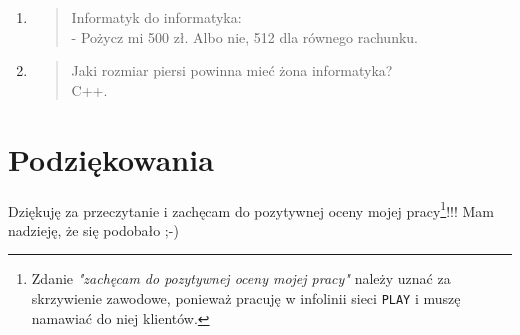 \documentclass[a4paper,12pt]{article}
\begin{document}
\begin{enumerate}
\item \begin{flushleft}
\begin{verse}
Informatyk do informatyka: \\
- Pożycz mi 500 zł. Albo nie, 512 dla równego rachunku. \\
\end{verse}
\end{flushleft}
\cite{kawal5}

\item \begin{flushleft}
\begin{verse}
Jaki rozmiar piersi powinna mieć żona informatyka? \\
C++. \\
\end{verse}
\end{flushleft}
\end{enumerate}
\cite{kawal6}

\newpage
\section{Podziękowania}
\label{sec:Podziekowania}
{\Large Dziękuję za przeczytanie i zachęcam do pozytywnej oceny mojej
pracy\footnote{Zdanie \emph{"zachęcam do pozytywnej oceny mojej pracy"} należy uznać za skrzywienie zawodowe, ponieważ pracuję w infolinii sieci \texttt{PLAY} i muszę namawiać do niej klientów.}!!! Mam nadzieję, że się podobało ;-)}



\end{document}

